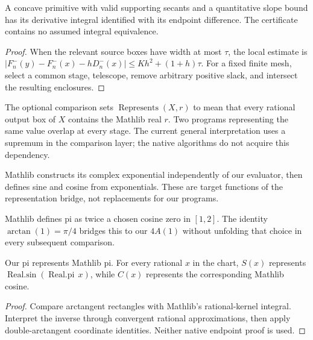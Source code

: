 \begin{theorem}\label{thm:c3-ftc}
\leanok
A concave primitive with valid supporting secants and a quantitative slope
bound has its derivative integral identified with its endpoint difference.
The certificate contains no assumed integral equivalence.
\end{theorem}
\begin{proof}\leanok
When the relevant source boxes have width at most $\tau$, the local estimate
is $|F_n^-(y)-F_n^-(x)-hD_n^-(x)|\le Kh^2+(1+h)\tau$.
For a fixed finite mesh, select a common stage, telescope, remove arbitrary
positive slack, and intersect the resulting enclosures.
\end{proof}

\begin{definition}\label{def:c3-real}
\leanok
The optional comparison sets $\operatorname{Represents}(X,r)$ to mean that
every rational output box of $X$ contains the Mathlib real $r$. Two programs
representing the same value overlap at every stage. The current general
interpretation uses a supremum in the comparison layer; the native algorithms
do not acquire this dependency.
\end{definition}

\begin{definition}\label{def:c3-mexp}
\mathlibok
Mathlib constructs its complex exponential independently of our evaluator,
then defines sine and cosine from exponentials. These are target functions
of the representation bridge, not replacements for our programs.
\end{definition}

\begin{definition}[Mathlib pi]\label{def:c3-mpi}
\mathlibok
Mathlib defines pi as twice a chosen cosine zero in $[1,2]$.
The identity $\arctan(1)=\pi/4$ bridges this to our $4A(1)$ without
unfolding that choice in every subsequent comparison.
\end{definition}

\begin{lemma}\label{lem:c3-values}
\leanok
Our pi represents Mathlib pi. For every rational $x$ in the chart, $S(x)$
represents $\operatorname{Real.sin}(\operatorname{Real.pi}\,x)$, while $C(x)$
represents the corresponding Mathlib cosine.
\end{lemma}
\begin{proof}\leanok
Compare arctangent rectangles with Mathlib's rational-kernel integral.
Interpret the inverse through convergent rational approximations, then apply
double-arctangent coordinate identities. Neither native endpoint proof is used.
\end{proof}

